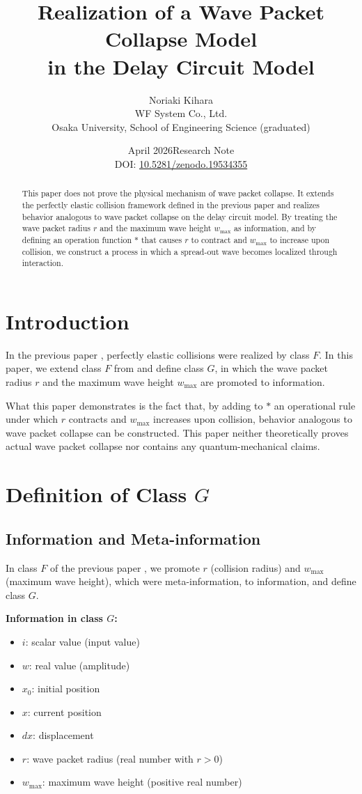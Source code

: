 \documentclass[12pt,a4paper]{article}
\title{Realization of a Wave Packet Collapse Model\\in the Delay Circuit Model}
\author{Noriaki Kihara\\
WF System Co., Ltd.\\
Osaka University, School of Engineering Science (graduated)}
\date{April 2026\quad Research Note\\[4pt]
DOI: \href{https://doi.org/10.5281/zenodo.19534355}{10.5281/zenodo.19534355}}
\begin{document}
\maketitle

\begin{abstract}
This paper does not prove the physical mechanism of wave packet collapse. It extends the perfectly elastic collision framework defined in the previous paper \cite{ref4} and realizes behavior analogous to wave packet collapse on the delay circuit model. By treating the wave packet radius $r$ and the maximum wave height $w_{\max}$ as information, and by defining an operation function $*$ that causes $r$ to contract and $w_{\max}$ to increase upon collision, we construct a process in which a spread-out wave becomes localized through interaction.
\end{abstract}

\section{Introduction}

In the previous paper \cite{ref4}, perfectly elastic collisions were realized by class $F$. In this paper, we extend class $F$ from \cite{ref4} and define class $G$, in which the wave packet radius $r$ and the maximum wave height $w_{\max}$ are promoted to information.

What this paper demonstrates is the fact that, by adding to $*$ an operational rule under which $r$ contracts and $w_{\max}$ increases upon collision, behavior analogous to wave packet collapse can be constructed. This paper neither theoretically proves actual wave packet collapse nor contains any quantum-mechanical claims.

\section{Definition of Class $G$}

\subsection{Information and Meta-information}

In class $F$ of the previous paper \cite{ref4}, we promote $r$ (collision radius) and $w_{\max}$ (maximum wave height), which were meta-information, to information, and define class $G$.

\textbf{Information in class $G$:}
\begin{itemize}
  \item $i$: scalar value (input value)
  \item $w$: real value (amplitude)
  \item $x_0$: initial position
  \item $x$: current position
  \item $dx$: displacement
  \item $r$: wave packet radius (real number with $r > 0$)
  \item $w_{\max}$: maximum wave height (positive real number)
\end{itemize}
\end{document}
